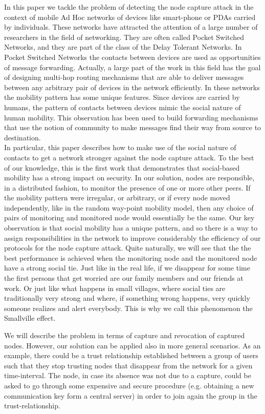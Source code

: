 \documentclass{IEEEconf}
\begin{document}
In this paper we tackle the problem of detecting the node capture attack in the context of mobile
Ad Hoc networks of devices like smart-phone or PDAs carried by individuals.
These networks have attracted the
attention of a large number of researchers in the field of networking. They
are often called Pocket Switched Networks, and they are part of the class of the Delay Tolerant
Networks. In Pocket Switched Networks the contacts between devices are used as
opportunities of message forwarding. Actually, a large part of the work in this field has
the goal of designing multi-hop routing mechanisms that are able to deliver messages
between any arbitrary pair of devices in the network efficiently.
In these networks the mobility pattern has some unique features. Since devices
are carried by humans, the pattern of contacts between devices mimic the social nature
of human mobility. This observation has been used to build forwarding mechanisms
that use the notion of community to make messages find their way from source to
destination.\\
In particular, this paper describes how to make use of the social nature of contacts to get
a network stronger against the node capture attack. To the best of our knowledge,
this is the first work that demonstrates that social-based mobility has a strong impact
on security. In our solution, nodes are responsible, in a distributed fashion, to monitor
the presence of one or more other peers. If the mobility pattern were irregular, or
arbitrary, or if every node moved independently, like in the random way-point
mobility model, then any choice of pairs of monitoring and monitored node would
essentially be the same. Our key observation is that social mobility has a unique pattern, and so
there is a way to assign responsibilities in the network to improve
considerably the efficiency of our protocols for the node capture attack.
Quite naturally, we will see that the the best performance is achieved when the
monitoring node and the monitored node have a strong social tie. Just like
in the real life, if we disappear for some time the first persons that get worried are
our family members and our friends at work. Or just like what happens in small villages,
where social ties are traditionally very strong and where,
if something wrong happens, very quickly someone realizes and alert everybody.
This is why we call this phenomenon the Smallville effect.


We will describe the problem in terms of capture and revocation of captured nodes. However, our
solution can be applied also in more general scenarios. As an example, there could be a trust relationship established between a group of users such that they stop trusting nodes that disappear
from the network for a given time-interval. The node, in case its absence was not due to
a capture, could be asked to go through some expensive and secure procedure (e.g. obtaining a new communication key form a central server) in order to join again the group in the
trust-relationship.
\end{document}

